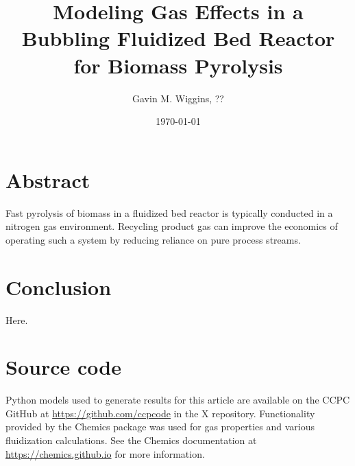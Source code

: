 \documentclass{article}
\title{Modeling Gas Effects in a Bubbling Fluidized Bed Reactor for Biomass Pyrolysis}
\author{Gavin M. Wiggins, ??}
\date{\today}
\begin{document}
\maketitle
\tableofcontents

\section*{Abstract}

Fast pyrolysis of biomass in a fluidized bed reactor is typically conducted in a nitrogen gas environment. Recycling product gas can improve the economics of operating such a system by reducing reliance on pure process streams.









\section{Conclusion}

Here.

\section{Source code}

Python models used to generate results for this article are available on the CCPC GitHub at \url{https://github.com/ccpcode} in the X repository. Functionality provided by the Chemics package was used for gas properties and various fluidization calculations. See the Chemics documentation at \url{https://chemics.github.io} for more information.

\printbibliography
\end{document}
